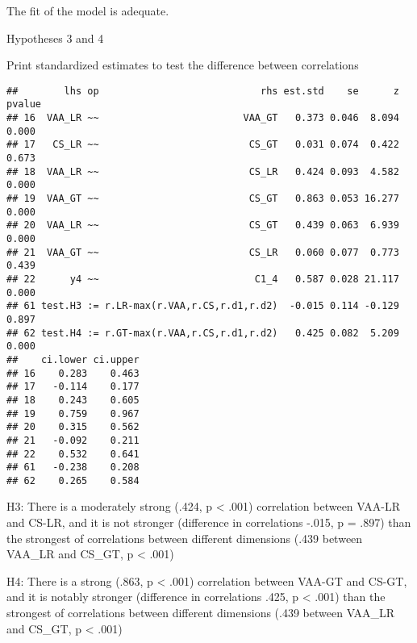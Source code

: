 \documentclass[
]{article}
\newenvironment{Shaded}{\begin{snugshade}}{\end{snugshade}}
\newcommand{\KeywordTok}[1]{\textcolor[rgb]{0.13,0.29,0.53}{\textbf{#1}}}
\newcommand{\NormalTok}[1]{#1}
\newcommand{\OperatorTok}[1]{\textcolor[rgb]{0.81,0.36,0.00}{\textbf{#1}}}
\newcommand{\StringTok}[1]{\textcolor[rgb]{0.31,0.60,0.02}{#1}}
\begin{document}
The fit of the model is adequate.

Hypotheses 3 and 4

Print standardized estimates to test the difference between correlations

\begin{Shaded}
\end{Shaded}

\begin{verbatim}
##        lhs op                            rhs est.std    se      z pvalue
## 16  VAA_LR ~~                         VAA_GT   0.373 0.046  8.094  0.000
## 17   CS_LR ~~                          CS_GT   0.031 0.074  0.422  0.673
## 18  VAA_LR ~~                          CS_LR   0.424 0.093  4.582  0.000
## 19  VAA_GT ~~                          CS_GT   0.863 0.053 16.277  0.000
## 20  VAA_LR ~~                          CS_GT   0.439 0.063  6.939  0.000
## 21  VAA_GT ~~                          CS_LR   0.060 0.077  0.773  0.439
## 22      y4 ~~                           C1_4   0.587 0.028 21.117  0.000
## 61 test.H3 := r.LR-max(r.VAA,r.CS,r.d1,r.d2)  -0.015 0.114 -0.129  0.897
## 62 test.H4 := r.GT-max(r.VAA,r.CS,r.d1,r.d2)   0.425 0.082  5.209  0.000
##    ci.lower ci.upper
## 16    0.283    0.463
## 17   -0.114    0.177
## 18    0.243    0.605
## 19    0.759    0.967
## 20    0.315    0.562
## 21   -0.092    0.211
## 22    0.532    0.641
## 61   -0.238    0.208
## 62    0.265    0.584
\end{verbatim}

H3: There is a moderately strong (.424, p \textless{} .001) correlation
between VAA-LR and CS-LR, and it is not stronger (difference in
correlations -.015, p = .897) than the strongest of correlations between
different dimensions (.439 between VAA\_LR and CS\_GT, p \textless{}
.001)

H4: There is a strong (.863, p \textless{} .001) correlation between
VAA-GT and CS-GT, and it is notably stronger (difference in correlations
.425, p \textless{} .001) than the strongest of correlations between
different dimensions (.439 between VAA\_LR and CS\_GT, p \textless{}
.001)
\end{document}
